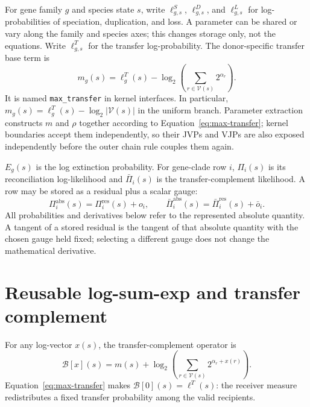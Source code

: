 \documentclass[11pt]{article}
\begin{document}
For gene family $g$ and species state $s$, write
$\ell^S_{g,s}$, $\ell^D_{g,s}$, and $\ell^L_{g,s}$ for log-probabilities of
speciation, duplication, and loss.  A parameter can be shared or vary along
the family and species axes; this changes storage only, not the equations.
Write $\ell^T_{g,s}$ for the transfer log-probability.  The donor-specific
transfer base term is
\begin{equation}
  m_g(s)=\ell^T_g(s)
  -\log_2\!\left(\sum_{r\in\mathcal V(s)}2^{\alpha_r}\right).
  \label{eq:max-transfer}
\end{equation}
It is named \texttt{max\_transfer} in kernel interfaces.  In particular,
$m_g(s)=\ell^T_g(s)-\log_2|\mathcal V(s)|$ in the uniform branch.  Parameter
extraction constructs $m$ and $\rho$ together according to
Equation~\eqref{eq:max-transfer}; kernel boundaries accept them independently,
so their JVPs and VJPs are also exposed independently before the outer chain
rule couples them again.

$E_g(s)$ is the log extinction probability.  For gene-clade row $i$,
$\Pi_i(s)$ is its reconciliation log-likelihood and $\bar\Pi_i(s)$ is the
transfer-complement likelihood.  A row may be stored as a residual plus a
scalar gauge:
\begin{equation}
  \Pi_i^{\mathrm{abs}}(s)=\Pi_i^{\mathrm{res}}(s)+o_i,
  \qquad
  \bar\Pi_i^{\mathrm{abs}}(s)=\bar\Pi_i^{\mathrm{res}}(s)+\bar o_i.
  \label{eq:gauge}
\end{equation}
All probabilities and derivatives below refer to the represented absolute
quantity.  A tangent of a stored residual is the tangent of that absolute
quantity with the chosen gauge held fixed; selecting a different gauge does
not change the mathematical derivative.

\section{Reusable log-sum-exp and transfer complement}

For any log-vector $x(s)$, the transfer-complement operator is
\begin{equation}
  \mathcal B[x](s)
  =m(s)+\log_2\!\left(
    \sum_{r\in\mathcal V(s)}2^{\alpha_r+x(r)}
  \right).
  \label{eq:transfer-complement-direct}
\end{equation}
Equation~\eqref{eq:max-transfer} makes
$\mathcal B[0](s)=\ell^T(s)$: the receiver measure redistributes a fixed
transfer probability among the valid recipients.
\end{document}
